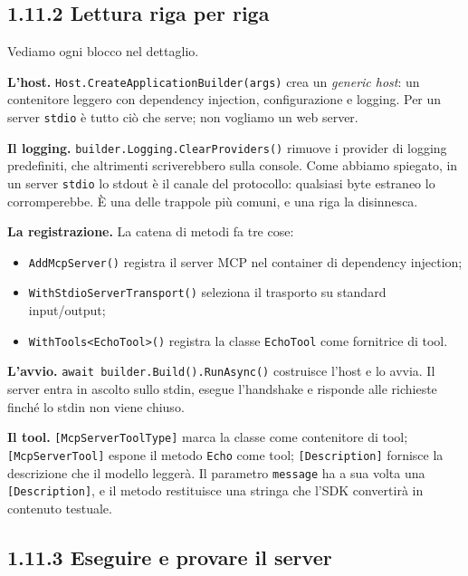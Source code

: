 \documentclass[
  italian,
  10pt,
]{book}
\providecommand{\tightlist}{%
  \setlength{\itemsep}{0pt}\setlength{\parskip}{0pt}}
\begin{document}
\subsection{1.11.2 Lettura riga per riga}\label{lettura-riga-per-riga}

Vediamo ogni blocco nel dettaglio.

\textbf{L'host.} \texttt{Host.CreateApplicationBuilder(args)} crea un
\emph{generic host}: un contenitore leggero con dependency injection,
configurazione e logging. Per un server \texttt{stdio} è tutto ciò che
serve; non vogliamo un web server.

\textbf{Il logging.} \texttt{builder.Logging.ClearProviders()} rimuove i
provider di logging predefiniti, che altrimenti scriverebbero sulla
console. Come abbiamo spiegato, in un server \texttt{stdio} lo stdout è
il canale del protocollo: qualsiasi byte estraneo lo corromperebbe. È
una delle trappole più comuni, e una riga la disinnesca.

\textbf{La registrazione.} La catena di metodi fa tre cose:

\begin{itemize}
\tightlist
\item
  \texttt{AddMcpServer()} registra il server MCP nel container di
  dependency injection;
\item
  \texttt{WithStdioServerTransport()} seleziona il trasporto su standard
  input/output;
\item
  \texttt{WithTools\textless{}EchoTool\textgreater{}()} registra la
  classe \texttt{EchoTool} come fornitrice di tool.
\end{itemize}

\textbf{L'avvio.} \texttt{await\ builder.Build().RunAsync()} costruisce
l'host e lo avvia. Il server entra in ascolto sullo stdin, esegue
l'handshake e risponde alle richieste finché lo stdin non viene chiuso.

\textbf{Il tool.} \texttt{{[}McpServerToolType{]}} marca la classe come
contenitore di tool; \texttt{{[}McpServerTool{]}} espone il metodo
\texttt{Echo} come tool; \texttt{{[}Description{]}} fornisce la
descrizione che il modello leggerà. Il parametro \texttt{message} ha a
sua volta una \texttt{{[}Description{]}}, e il metodo restituisce una
stringa che l'SDK convertirà in contenuto testuale.

\subsection{1.11.3 Eseguire e provare il
server}\label{eseguire-e-provare-il-server}
\end{document}
